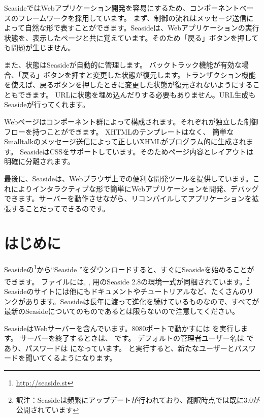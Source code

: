 \documentclass[a4paper,10pt,twoside]{book}
\begin{document}
SeasideではWebアプリケーション開発を容易にするため、コンポーネントベースのフレームワークを採用しています。
まず、制御の流れはメッセージ送信によって自然な形で表すことができます。Seasideは、Webアプリケーションの実行状態を、表示したページと共に覚えています。そのため「戻る」ボタンを押しても問題が生じません。

また、状態はSeasideが自動的に管理します。
バックトラック機能が有効な場合、「戻る」ボタンを押すと変更した状態が復元します。トランザクション機能を使えば、戻るボタンを押したときに変更した状態が復元されないようにすることもできます。
URLに状態を埋め込んだりする必要もありません。URL生成もSeasideが行ってくれます。

Webページはコンポーネント群によって構成されます。それぞれが独立した制御フローを持つことができます。
XHTMLのテンプレートはなく、 簡単なSmalltalkのメッセージ送信によって正しいXHMLがプログラム的に生成されます。
SeasideはCSSをサポートしています。そのためページ内容とレイアウトは明確に分離されます。

最後に、Seasideは、Webブラウザ上での便利な開発ツールを提供しています。これによりインタラクティブな形で簡単にWebアプリケーションを開発、デバッグできます。サーバーを動作させながら、リコンパイルしてアプリケーションを拡張することだってできるのです。
\section{はじめに}

Seasideの\footnote{\url{http://seaside.st}}から``Seaside ''をダウンロードすると、すぐにSeasideを始めることができます。
ファイルには, ,  用のSeaside 2.8の環境一式が同梱されています。\footnote{訳注：Seasideは頻繁にアップデートが行われており、翻訳時点では既に3.0が公開されています}
Seasideのサイトには他にもドキュメントやチュートリアルなど、たくさんのリンクがあります。Seasideは長年に渡って進化を続けているものなので、すべてが最新のSeasideについてのものであるとは限らないので注意してください。


SeasideはWebサーバーを含んでいます。8080ポートで動かすには   を実行します。
サーバーを終了するときは、 です。
デフォルトの管理者ユーザー名は  であり、パスワードは になっています。
   と実行すると、新たなユーザーとパスワードを聞いてくるようになります。
\end{document}

